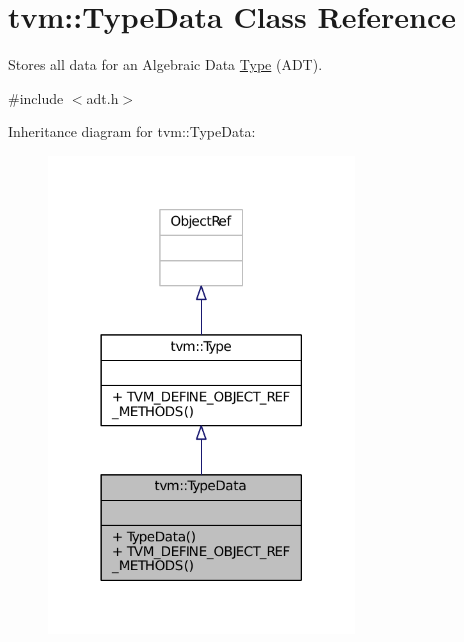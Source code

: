 \hypertarget{classtvm_1_1TypeData}{}\section{tvm\+:\+:Type\+Data Class Reference}
\label{classtvm_1_1TypeData}


Stores all data for an Algebraic Data \hyperlink{classtvm_1_1Type}{Type} (A\+DT).  




{\ttfamily \#include $<$adt.\+h$>$}



Inheritance diagram for tvm\+:\+:Type\+Data\+:
\nopagebreak
\begin{figure}[H]
\begin{center}
\leavevmode
\includegraphics[width=230pt]{classtvm_1_1TypeData__inherit__graph}
\end{center}
\end{figure}


